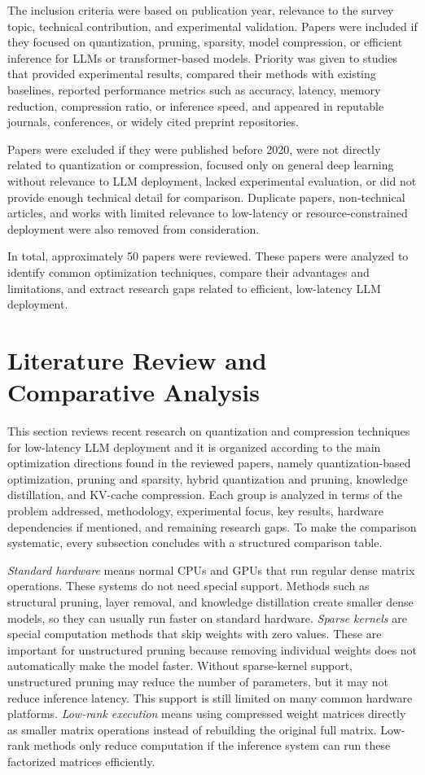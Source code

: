 The inclusion criteria were based on publication year, relevance to the survey topic, technical contribution, and experimental validation. Papers were included if they focused on quantization, pruning, sparsity, model compression, or efficient inference for LLMs or transformer-based models. Priority was given to studies that provided experimental results, compared their methods with existing baselines, reported performance metrics such as accuracy, latency, memory reduction, compression ratio, or inference speed, and appeared in reputable journals, conferences, or widely cited preprint repositories.

Papers were excluded if they were published before 2020, were not directly related to quantization or compression, focused only on general deep learning without relevance to LLM deployment, lacked experimental evaluation, or did not provide enough technical detail for comparison. Duplicate papers, non-technical articles, and works with limited relevance to low-latency or resource-constrained deployment were also removed from consideration.

In total, approximately 50 papers were reviewed. These papers were analyzed to identify common optimization techniques, compare their advantages and limitations, and extract research gaps related to efficient, low-latency LLM deployment.

\section{Literature Review and Comparative Analysis}
\label{sec:lr-review}

This section reviews recent research on quantization and compression techniques for low-latency LLM deployment and it is organized according to the main optimization directions found in the reviewed papers, namely quantization-based optimization, pruning and sparsity, hybrid quantization and pruning, knowledge distillation, and KV-cache compression. Each group is analyzed in terms of the problem addressed, methodology, experimental focus, key results, hardware dependencies if mentioned, and remaining research gaps. To make the comparison systematic, every subsection concludes with a structured comparison table.

\emph{Standard hardware} means normal CPUs and GPUs that run regular dense matrix operations. These systems do not need special support. Methods such as structural pruning, layer removal, and knowledge distillation create smaller dense models, so they can usually run faster on standard hardware. \emph{Sparse kernels} are special computation methods that skip weights with zero values. These are important for unstructured pruning because removing individual weights does not automatically make the model faster. Without sparse-kernel support, unstructured pruning may reduce the number of parameters, but it may not reduce inference latency. This support is still limited on many common hardware platforms. \emph{Low-rank execution} means using compressed weight matrices directly as smaller matrix operations instead of rebuilding the original full matrix. Low-rank methods only reduce computation if the inference system can run these factorized matrices efficiently.

